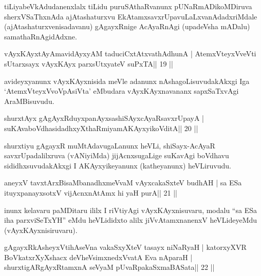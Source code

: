 \begin{artha}
tiLiyabeVkAdudanenxlalx tiLidu puruSAthaRvanunx pUNaRmADikoMDiruva sherxVSaThx\-nAda ajAtashaturxvu EkAtamxsavxrUpavuLaLxvanAdadxriMdale (ajAtashaturxvenisada\-vanu) gAgayxRnige AcAyaRnAgi (upadeVsha mADalu) samathaRnAgidAdxne.
\end{artha}

\begin{shl}
vAyxKAyxtAyAmavidAyxyAM taduciCxtAtxvathAdhunA |
AtemxVteyxVveVti sUtarxsayx vAyxKAyx parxsUtxyateV suPxTA\hfill || 19 ||
\end{shl}

\begin{artha}
avideyxyanunx vAyxKAyxnisida meVle adanunx nAshagoLisuvudakAkxgi Iga `AtemxVteyxVvoVpAsiVta' eMbudara vAyxKAyxnavananx sapxSaTxvAgi AraMBisuvudu.
\end{artha}


\begin{shl}
shurxtAyx gAgAyxRduyxpanAyxsashiSAyxcAyaRsavxrUpayA |
suKAvaboVdhasidadhxyXthaRmiyamAKAyxyikoVditA\hfill || 20 ||
\end{shl}

\begin{artha}
shurxtiyu gAgayxR muMtAdavugaLanunx heVLi, shiSayx-AcAyaR savxrUpadalilxruva (vANiyiMda) jijAcnxsugaLige suKavAgi boVdhavu sididhxsuvudakAkxgi I AKAyxyike\-yanunx (katheyanunx) heVLiruvudu.
\end{artha}


\begin{shl}
aneyxV tavxtArxBisaMbanadhxmeVvaM vAyxcakaSxteV budhAH |
sa ESa ituyxpanayxsotxV vijAcnxnAtAmx hi yaH purA\hfill || 21 ||
\end{shl}

\begin{artha}
inunx kelavaru paMDitaru ililx I riVtiyAgi vAyxKAyxnisuvaru, modalu  ``sa ESa iha parxviSeTxYH'' eMdu heVLididxto alilx jiVvAtamxnanenxV heVLideyeMdu (vAyxKAyxnisiruvaru).
\end{artha}


\begin{shl}
gAgayxRkAsheyxVtihAseVna vakaSxyXteV tasayx niNaRyaH |
katorxyXVR BoVkatxrXyXshacx deVheV\s simxnedxVvatA Eva nAparaH |
shurxtigARgAyxRtamxnA seVyaM pUvaRpakaSxmaBASata\hfill || 22 ||
\end{shl}

